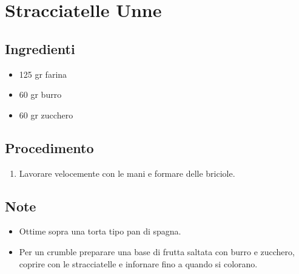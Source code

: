 \section{Stracciatelle Unne}
\subsection{Ingredienti}
\begin{itemize}
\item 125 gr farina  
\item 60 gr burro  
\item 60 gr zucchero
\end{itemize}
\subsection{Procedimento}
\begin{enumerate}
\item  Lavorare velocemente con le mani e formare delle briciole.
\end{enumerate}
\subsection{Note}
\begin{itemize}
\item Ottime sopra una torta tipo pan di spagna.  
\item Per un crumble preparare una base di frutta saltata con burro e zucchero, coprire con le stracciatelle e infornare fino a quando si colorano.
\end{itemize}
